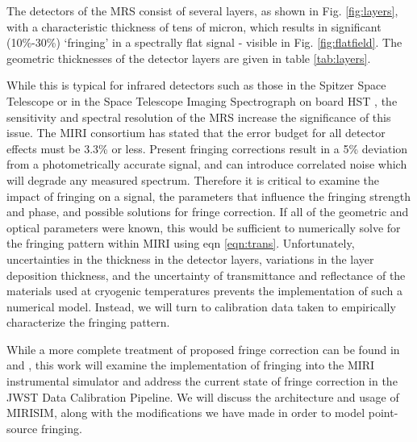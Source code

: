 The detectors of the MRS consist of several layers, as shown in Fig. \ref{fig:layers}, with a characteristic thickness of tens of micron, which results in significant (10\%-30\%) `fringing' in a spectrally flat signal - visible in Fig. \ref{fig:flatfield}.
The geometric thicknesses of the detector layers are given in table \ref{tab:layers}.

While this is typical for infrared detectors such as those in the Spitzer Space Telescope \parencite{Lahuis2003} or in the Space Telescope Imaging Spectrograph on board HST \parencite{Malumuth2003}, the sensitivity and spectral resolution of the MRS increase the significance of this issue.
The MIRI consortium has stated that the error budget for all detector effects must be 3.3\% or less. 
Present fringing corrections result in a 5\% deviation from a photometrically accurate signal, and can introduce correlated noise which will degrade any measured spectrum.
Therefore it is critical to examine the impact of fringing on a signal, the parameters that influence the fringing strength and phase, and possible solutions for fringe correction. 
If all of the geometric and optical parameters were known, this would be sufficient to numerically solve for the fringing pattern within MIRI using eqn \ref{eqn:trans}. 
Unfortunately, uncertainties in the thickness in the detector layers, variations in the layer deposition thickness, and the uncertainty of transmittance and reflectance of the materials used at cryogenic temperatures prevents the implementation of such a numerical model.
Instead, we will turn to calibration data taken to empirically characterize the fringing pattern.

While a more complete treatment of proposed fringe correction can be found in \parencite{Argryiou2020} and \parencite{Lahuis2018}, this work will examine the implementation of fringing into the MIRI instrumental simulator and address the current state of fringe correction in the JWST Data Calibration Pipeline.
We will discuss the architecture and usage of MIRISIM, along with the modifications we have made in order to model point-source fringing.

